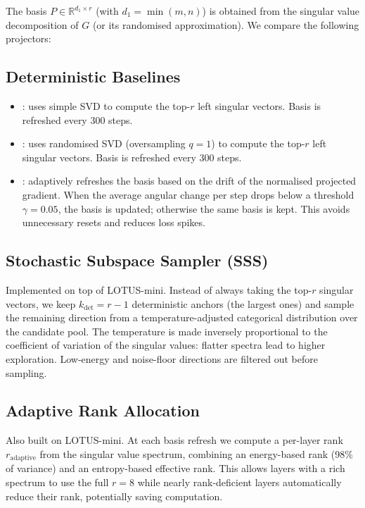 \documentclass[conference]{IEEEtran}
\begin{document}
The basis \(P\in\mathbb{R}^{d_1\times r}\) (with \(d_1=\min(m,n)\)) is obtained from the singular value decomposition of \(G\) (or its randomised approximation). We compare the following projectors:

\subsection{Deterministic Baselines}
\begin{itemize}
    \item {}: uses simple SVD to compute the top-\(r\) left singular vectors. Basis is refreshed every 300 steps.
    \item {}: uses randomised SVD (oversampling \(q=1\)) to compute the top-\(r\) left singular vectors. Basis is refreshed every 300 steps.
    \item {}: adaptively refreshes the basis based on the drift of the normalised projected gradient. When the average angular change per step drops below a threshold \(\gamma=0.05\), the basis is updated; otherwise the same basis is kept. This avoids unnecessary resets and reduces loss spikes.
\end{itemize}

\subsection{Stochastic Subspace Sampler (SSS)}
Implemented on top of LOTUS-mini. Instead of always taking the top-\(r\) singular vectors, we keep \(k_{\text{det}}=r-1\) deterministic anchors (the largest ones) and sample the remaining direction from a temperature-adjusted categorical distribution over the candidate pool. The temperature is made inversely proportional to the coefficient of variation of the singular values: flatter spectra lead to higher exploration. Low-energy and noise-floor directions are filtered out before sampling.

\subsection{Adaptive Rank Allocation}
Also built on LOTUS-mini. At each basis refresh we compute a per-layer rank \(r_{\text{adaptive}}\) from the singular value spectrum, combining an energy-based rank (98\% of variance) and an entropy-based effective rank. This allows layers with a rich spectrum to use the full \(r=8\) while nearly rank-deficient layers automatically reduce their rank, potentially saving computation.
\end{document}
